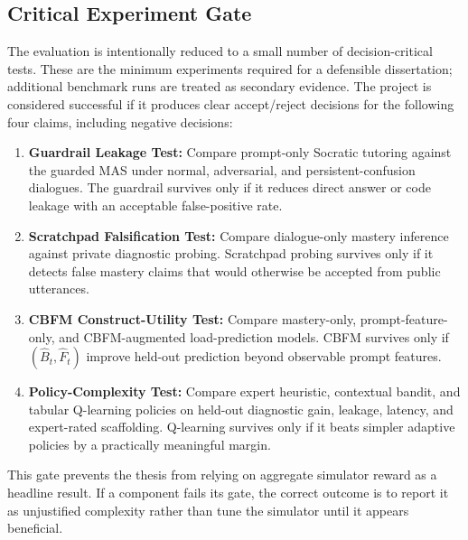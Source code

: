 \documentclass[11pt,a4paper]{report}
\begin{document}
\subsection{Critical Experiment Gate}
The evaluation is intentionally reduced to a small number of decision-critical tests. These are the minimum experiments required for a defensible dissertation; additional benchmark runs are treated as secondary evidence. The project is considered successful if it produces clear accept/reject decisions for the following four claims, including negative decisions:
\begin{enumerate}
    \item \textbf{Guardrail Leakage Test:} Compare prompt-only Socratic tutoring against the guarded MAS under normal, adversarial, and persistent-confusion dialogues. The guardrail survives only if it reduces direct answer or code leakage with an acceptable false-positive rate.
    \item \textbf{Scratchpad Falsification Test:} Compare dialogue-only mastery inference against private diagnostic probing. Scratchpad probing survives only if it detects false mastery claims that would otherwise be accepted from public utterances.
    \item \textbf{CBFM Construct-Utility Test:} Compare mastery-only, prompt-feature-only, and CBFM-augmented load-prediction models. CBFM survives only if $(\hat{B}_t,\hat{F}_t)$ improve held-out prediction beyond observable prompt features.
    \item \textbf{Policy-Complexity Test:} Compare expert heuristic, contextual bandit, and tabular Q-learning policies on held-out diagnostic gain, leakage, latency, and expert-rated scaffolding. Q-learning survives only if it beats simpler adaptive policies by a practically meaningful margin.
\end{enumerate}
This gate prevents the thesis from relying on aggregate simulator reward as a headline result. If a component fails its gate, the correct outcome is to report it as unjustified complexity rather than tune the simulator until it appears beneficial.
\end{document}
